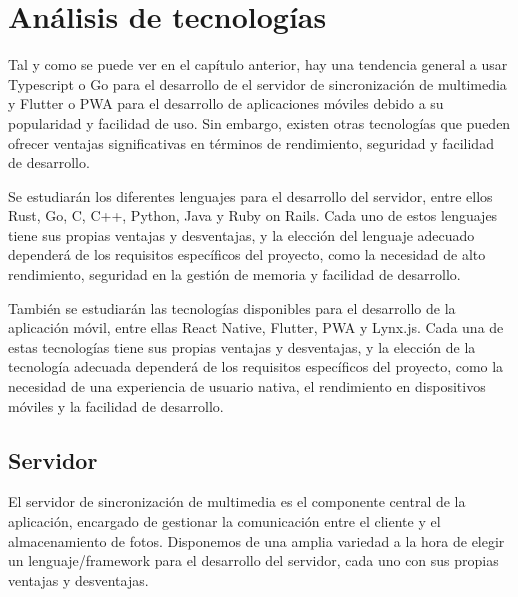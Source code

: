 \newpage
\section{Análisis de tecnologías}
\label{sec:tecnologias}


Tal y como se puede ver en el capítulo anterior, hay una tendencia general a usar Typescript o Go para el desarrollo de el servidor de sincronización de multimedia y Flutter o PWA para el desarrollo de aplicaciones móviles debido a su popularidad y facilidad de uso.
Sin embargo, existen otras tecnologías que pueden ofrecer ventajas significativas en términos de rendimiento, seguridad y facilidad de desarrollo.

Se estudiarán los diferentes lenguajes para el desarrollo del servidor, entre ellos Rust, Go, C, C++, Python, Java y Ruby on Rails. Cada uno de estos lenguajes tiene sus propias ventajas y desventajas, y la elección del lenguaje adecuado dependerá de los requisitos específicos del proyecto, como la necesidad de alto rendimiento, seguridad en la gestión de memoria y facilidad de desarrollo.

También se estudiarán las tecnologías disponibles para el desarrollo de la aplicación móvil, entre ellas React Native, Flutter, PWA y Lynx.js. Cada una de estas tecnologías tiene sus propias ventajas y desventajas, y la elección de la tecnología adecuada dependerá de los requisitos específicos del proyecto, como la necesidad de una experiencia de usuario nativa, el rendimiento en dispositivos móviles y la facilidad de desarrollo.

\subsection{Servidor}
El servidor de sincronización de multimedia es el componente central de la aplicación, encargado de gestionar la comunicación entre el cliente y el almacenamiento de fotos.
Disponemos de una amplia variedad a la hora de elegir un lenguaje/\gls{framework} para el desarrollo del servidor, cada uno con sus propias ventajas y desventajas.

